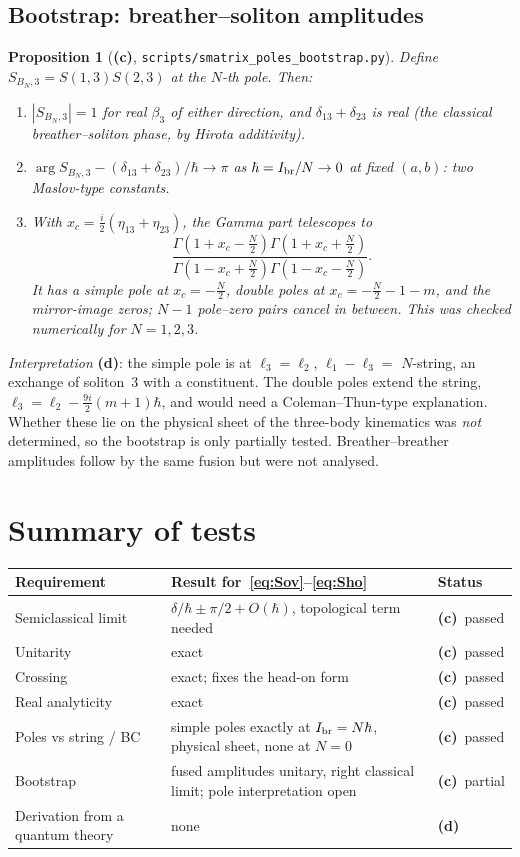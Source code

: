 \documentclass[11pt,a4paper]{article}
\newcommand{\Lc}{\textsf{\textbf{(c)}}}
\newcommand{\Ld}{\textsf{\textbf{(d)}}}
\newcommand{\script}[1]{\texttt{scripts/#1}}
\newtheorem{proposition}{Proposition}[section]
\theoremstyle{remark}\newtheorem{remark}[proposition]{Remark}
\begin{document}
\subsection{Bootstrap: breather--soliton amplitudes}
\begin{proposition}[\Lc, \script{smatrix\_poles\_bootstrap.py}]\label{prop:boot}
Define $S_{B_N,3}=S(1,3)S(2,3)$ at the $N$-th pole. Then:
\begin{enumerate}
\item $|S_{B_N,3}|=1$ for real $\beta_3$ of either direction, and $\delta_{13}+\delta_{23}$ is real (the classical breather--soliton phase, by Hirota additivity).
\item $\arg S_{B_N,3}-(\delta_{13}+\delta_{23})/\hbar\to\pi$ as $\hbar=I_{\rm br}/N\to0$ at fixed $(a,b)$: two Maslov-type constants.
\item With $x_c=\tfrac i2(\eta_{13}+\eta_{23})$, the Gamma part telescopes to
\[
\frac{\Gamma(1+x_c-\frac N2)\Gamma(1+x_c+\frac N2)}{\Gamma(1-x_c+\frac N2)\Gamma(1-x_c-\frac N2)} .
\]
It has a simple pole at $x_c=-\tfrac N2$, double poles at $x_c=-\tfrac N2-1-m$, and the mirror-image zeros; $N-1$ pole--zero pairs cancel in between. This was checked numerically for $N=1,2,3$.
\end{enumerate}
\end{proposition}
\emph{Interpretation} \Ld: the simple pole is at $\ell_3=\ell_2$, $\ell_1-\ell_3=$ $N$-string, an exchange of soliton~3 with a constituent. The double poles extend the string, $\ell_3=\ell_2-\tfrac{9i}{2}(m+1)\hbar$, and would need a Coleman--Thun-type explanation. Whether these lie on the physical sheet of the three-body kinematics was \emph{not} determined, so the bootstrap is only partially tested. Breather--breather amplitudes follow by the same fusion but were not analysed.

\section{Summary of tests}
\begin{center}\small
\begin{tabular}{@{}p{4.3cm}p{8.0cm}p{2.3cm}@{}}\toprule
Requirement & Result for~\eqref{eq:Sov}--\eqref{eq:Sho} & Status\\\midrule
Semiclassical limit & $\delta/\hbar\pm\pi/2+O(\hbar)$, topological term needed & \Lc\ passed\\
Unitarity & exact & \Lc\ passed\\
Crossing & exact; fixes the head-on form & \Lc\ passed\\
Real analyticity & exact & \Lc\ passed\\
Poles vs string / BC & simple poles exactly at $I_{\rm br}=N\hbar$, physical sheet, none at $N=0$ & \Lc\ passed\\
Bootstrap & fused amplitudes unitary, right classical limit; pole interpretation open & \Lc\ partial\\
Derivation from a quantum theory & none & \Ld\\
\bottomrule\end{tabular}\end{center}
\end{document}
